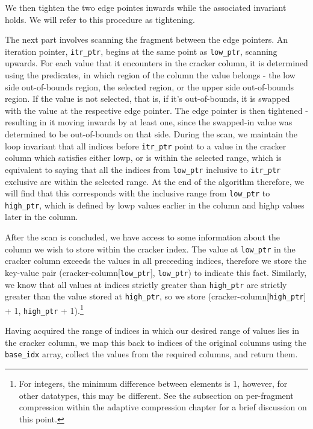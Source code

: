 We then tighten the two edge pointes inwards while the associated invariant holds. We will refer to
this procedure as tightening.

The next part involves scanning the fragment between the edge pointers. An iteration pointer,
\texttt{itr\_ptr}, begins at the same point as \texttt{low\_ptr}, scanning upwards. For each value that it encounters in the cracker column, it is determined using the predicates, in which region of
the column the value belongs - the low side out-of-bounds region, the selected region, or the upper
side out-of-bounds region. If the value is not selected, that is, if it's out-of-bounds, it is swapped
with the value at the respective edge pointer. The edge pointer is then tightened - resulting in it
moving inwards by at least one, since the swapped-in value was determined to be out-of-bounds on that
side. During the scan, we maintain the loop invariant that all indices before \texttt{itr\_ptr} point
to a value in the cracker column which satisfies either lowp, or is within the selected range, which
is equivalent to saying that all the indices from \texttt{low\_ptr} inclusive to \texttt{itr\_ptr}
exclusive are within the selected range. At the end of the algorithm therefore, we will find that
this corresponds with the inclusive range from \texttt{low\_ptr} to \texttt{high\_ptr}, which is
defined by lowp values earlier in the column and highp values later in the column.

After the scan is concluded, we have access to some information about the column we wish to store
within the cracker index. The value at \texttt{low\_ptr} in the cracker column exceeds the values in all preceeding indices, therefore we store the key-value pair (cracker-column[\texttt{low\_ptr}],
\texttt{low\_ptr}) to indicate this fact. Similarly, we know that all values at indices strictly greater than \texttt{high\_ptr} are strictly greater than the value stored at \texttt{high\_ptr}, so
we store (cracker-column[\texttt{high\_ptr}] + 1, \texttt{high\_ptr} + 1).\footnote{For integers, the
minimum difference between elements is 1, however, for other datatypes, this may be different. See
the subsection on per-fragment compression within the adaptive compression chapter for a brief discussion on this point.}

Having acquired the range of indices in which our desired range of values lies in the cracker column,
we map this back to indices of the original columns using the \texttt{base\_idx} array, collect the
values from the required columns, and return them.

